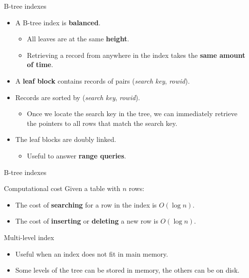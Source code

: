 \documentclass[xcolor=table]{beamer}
\begin{document}
\begin{frame}{B-tree indexes}
  \begin{itemize} 
    \item A B-tree index is {\bf balanced}.
    \begin{itemize}
      \item All leaves are at the same {\bf height}.
      \item Retrieving a record from anywhere in the index takes 
      the {\bf same amount of time}.
    \end{itemize}
    \vfill
    \item A {\bf leaf block} contains records of 
    pairs ({\em search key}, {\em rowid}).
    \vfill
    \item Records are sorted by ({\em search key}, {\em rowid}).
    \begin{itemize}
      \item Once we locate the search key in the tree, we can 
      immediately retrieve the pointers to all rows that match the search key.
    \end{itemize}
    \vfill
    \item The leaf blocks are doubly linked. 
    \begin{itemize}
      \item Useful to answer {\bf range queries}.
    \end{itemize}
  \end{itemize}
\end{frame}

\begin{frame}{B-tree indexes}
  \begin{block}{Computational cost}
  Given a table with $n$ rows:
  \begin{itemize}
    \item The cost of {\bf searching} for a row in the index 
    is $O(\log n)$.
    
    \item The cost of {\bf inserting} or  {\bf deleting} a new row 
    is $O(\log n)$.
  \end{itemize}
\end{block}
  \vfill
  \begin{exampleblock}{Multi-level index}
    \begin{itemize}
      \item Useful when an index does not fit in main memory.
      \item Some levels of the tree can be stored in memory, 
      the others can be on disk.
    \end{itemize}
  \end{exampleblock}
\end{frame}
\end{document}
